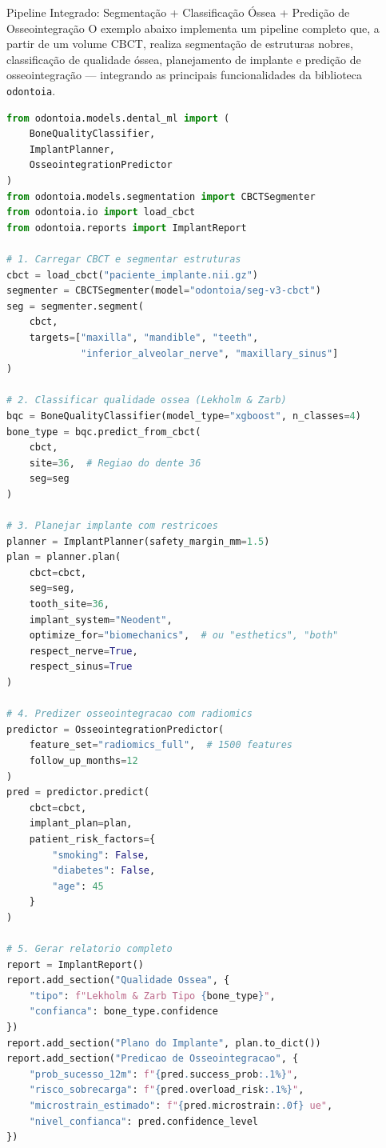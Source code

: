 \begin{pratica}{Pipeline Integrado: Segmentação + Classificação Óssea + Predição de Osseointegração}
O exemplo abaixo implementa um pipeline completo que, a partir de um volume CBCT, realiza segmentação de estruturas nobres, classificação de qualidade óssea, planejamento de implante e predição de osseointegração --- integrando as principais funcionalidades da biblioteca \texttt{odontoia}.

\begin{lstlisting}[language=Python, caption={Pipeline completo de implantodontia assistida por IA}]
from odontoia.models.dental_ml import (
    BoneQualityClassifier,
    ImplantPlanner,
    OsseointegrationPredictor
)
from odontoia.models.segmentation import CBCTSegmenter
from odontoia.io import load_cbct
from odontoia.reports import ImplantReport

# 1. Carregar CBCT e segmentar estruturas
cbct = load_cbct("paciente_implante.nii.gz")
segmenter = CBCTSegmenter(model="odontoia/seg-v3-cbct")
seg = segmenter.segment(
    cbct,
    targets=["maxilla", "mandible", "teeth", 
             "inferior_alveolar_nerve", "maxillary_sinus"]
)

# 2. Classificar qualidade ossea (Lekholm & Zarb)
bqc = BoneQualityClassifier(model_type="xgboost", n_classes=4)
bone_type = bqc.predict_from_cbct(
    cbct, 
    site=36,  # Regiao do dente 36
    seg=seg
)

# 3. Planejar implante com restricoes
planner = ImplantPlanner(safety_margin_mm=1.5)
plan = planner.plan(
    cbct=cbct,
    seg=seg,
    tooth_site=36,
    implant_system="Neodent",
    optimize_for="biomechanics",  # ou "esthetics", "both"
    respect_nerve=True,
    respect_sinus=True
)

# 4. Predizer osseointegracao com radiomics
predictor = OsseointegrationPredictor(
    feature_set="radiomics_full",  # 1500 features
    follow_up_months=12
)
pred = predictor.predict(
    cbct=cbct,
    implant_plan=plan,
    patient_risk_factors={
        "smoking": False,
        "diabetes": False,
        "age": 45
    }
)

# 5. Gerar relatorio completo
report = ImplantReport()
report.add_section("Qualidade Ossea", {
    "tipo": f"Lekholm & Zarb Tipo {bone_type}",
    "confianca": bone_type.confidence
})
report.add_section("Plano do Implante", plan.to_dict())
report.add_section("Predicao de Osseointegracao", {
    "prob_sucesso_12m": f"{pred.success_prob:.1%}",
    "risco_sobrecarga": f"{pred.overload_risk:.1%}",
    "microstrain_estimado": f"{pred.microstrain:.0f} ue",
    "nivel_confianca": pred.confidence_level
})


\end{lstlisting}
\end{pratica}
